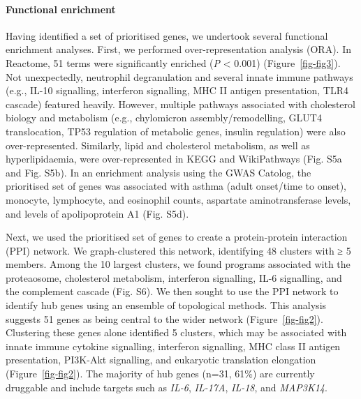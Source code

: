 \documentclass[
  11,
  a4paper,
]{article}
\let\oldparagraph\paragraph
\renewcommand{\paragraph}[1]{\oldparagraph{#1}\mbox{}}
\begin{document}
\paragraph{Functional enrichment}\label{functional-enrichment}

Having identified a set of prioritised genes, we undertook several
functional enrichment analyses. First, we performed over-representation
analysis (ORA). In Reactome, 51 terms were significantly enriched
(\emph{P} \textless{} 0.001) (Figure~\ref{fig-fig3}). Not unexpectedly,
neutrophil degranulation and several innate immune pathways (e.g., IL-10
signalling, interferon signalling, MHC II antigen presentation, TLR4
cascade) featured heavily. However, multiple pathways associated with
cholesterol biology and metabolism (e.g., chylomicron
assembly/remodelling, GLUT4 translocation, TP53 regulation of metabolic
genes, insulin regulation) were also over-represented. Similarly, lipid
and cholesterol metabolism, as well as hyperlipidaemia, were
over-represented in KEGG and WikiPathways (Fig. S5a and Fig. S5b). In an
enrichment analysis using the GWAS Catolog, the prioritised set of genes
was associated with asthma (adult onset/time to onset), monocyte,
lymphocyte, and eosinophil counts, aspartate aminotransferase levels,
and levels of apolipoprotein A1 (Fig. S5d).

Next, we used the prioritised set of genes to create a protein-protein
interaction (PPI) network. We graph-clustered this network, identifying
48 clusters with ≥ 5 members. Among the 10 largest clusters, we found
programs associated with the proteaosome, cholesterol metabolism,
interferon signalling, IL-6 signalling, and the complement cascade (Fig.
S6). We then sought to use the PPI network to identify hub genes using
an ensemble of topological methods. This analysis suggests 51 genes as
being central to the wider network (Figure~\ref{fig-fig2}). Clustering
these genes alone identified 5 clusters, which may be associated with
innate immune cytokine signalling, interferon signalling, MHC class II
antigen presentation, PI3K-Akt signalling, and eukaryotic translation
elongation (Figure~\ref{fig-fig2}). The majority of hub genes (n=31,
61\%) are currently druggable and include targets such as \emph{IL-6},
\emph{IL-17A}, \emph{IL-18}, and \emph{MAP3K14}.
\end{document}
